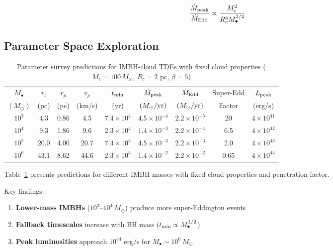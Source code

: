 \documentclass[twocolumn,amsmath,amssymb,prd,superscriptaddress,nofootinbib]{revtex4-2}
\begin{document}
\begin{equation}
    \frac{\dot{M}_{\rm peak}}{\dot{M}_{\rm Edd}} \propto \frac{M_c^2}{R_c^3 M_\bullet^{3/2}}
    \label{eq:Edd_ratio_scaling}
\end{equation}

\subsection{Parameter Space Exploration}
\label{sec:param_space}

\begin{table}[t]
\centering
\caption{Parameter survey predictions for IMBH-cloud TDEs with fixed cloud properties ($M_c = 100\,M_\odot$, $R_c = 2$ pc, $\beta = 5$)}
\label{tab:param_survey}
\begin{tabular}{ccccccccc}
\toprule
$M_\bullet$ & $r_t$ & $r_p$ & $v_p$ & $t_{\rm min}$ & $\dot{M}_{\rm peak}$ & $\dot{M}_{\rm Edd}$ & Super-Edd & $L_{\rm peak}$ \\
$(M_\odot)$ & (pc) & (pc) & (km/s) & (yr) & $(M_\odot/{\rm yr})$ & $(M_\odot/{\rm yr})$ & Factor & (erg/s) \\
\midrule
$10^3$ & 4.3 & 0.86 & 4.5 & $7.4\times 10^4$ & $4.5\times 10^{-4}$ & $2.2\times 10^{-5}$ & 20 & $4\times 10^{41}$ \\
$10^4$ & 9.3 & 1.86 & 9.6 & $2.3\times 10^4$ & $1.4\times 10^{-3}$ & $2.2\times 10^{-4}$ & 6.5 & $4\times 10^{42}$ \\
$10^5$ & 20.0 & 4.00 & 20.7 & $7.4\times 10^3$ & $4.5\times 10^{-3}$ & $2.2\times 10^{-3}$ & 2.0 & $4\times 10^{43}$ \\
$10^6$ & 43.1 & 8.62 & 44.6 & $2.3\times 10^3$ & $1.4\times 10^{-2}$ & $2.2\times 10^{-2}$ & 0.65 & $4\times 10^{44}$ \\
\bottomrule
\end{tabular}
\end{table}

Table~\ref{tab:param_survey} presents predictions for different IMBH masses with fixed cloud properties and penetration factor.

Key findings:
\begin{enumerate}
    \item \textbf{Lower-mass IMBHs} ($10^3$--$10^4\,M_\odot$) produce more super-Eddington events
    \item \textbf{Fallback timescales} increase with BH mass ($t_{\rm min} \propto M_\bullet^{1/2}$)
    \item \textbf{Peak luminosities} approach $10^{44}$ erg/s for $M_\bullet \sim 10^6\,M_\odot$
\end{enumerate}
\end{document}
